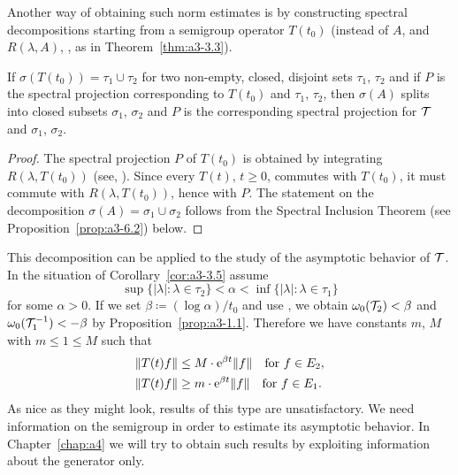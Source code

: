 Another way of obtaining such norm estimates is by constructing spectral decompositions starting from a semigroup operator $T(t_{0})$ (instead of\/ $A$, and $R(\lambda,A)$, \resp, as in Theorem~\ref{thm:a3-3.3}).
\begin{corollary}\label{cor:a3-3.5}
If\/ $\sigma(T(t_{0})) = \tau_{1} \cup \tau_{2}$ for two non-empty, closed, disjoint sets $\tau_{1}$, $\tau_{2}$ and if\/ $P$ is the spectral projection corresponding to $T(t_{0})$ and $\tau_{1}$, $\tau_{2}$, then $\sigma(A)$ splits into closed subsets $\sigma_{1}$, $\sigma_{2}$ and $P$ is the corresponding spectral projection for $\mathcal{T}$ and $\sigma_{1}$, $\sigma_{2}$.
\end{corollary}
\begin{proof}
The spectral projection $P$ of\/ $T(t_{0})$ is obtained by integrating $R(\lambda,T(t_{0}))$ (see, \eg \textcite[Section VII.3]{dunfordschwartz:1958}).
Since every $T(t)$, $t \geq 0$, commutes with $T(t_{0})$, it must commute with $R(\lambda,T(t_{0}))$, hence with $P$.
The statement on the decomposition $\sigma(A) = \sigma_{1} \cup \sigma_{2}$ follows from the Spectral Inclusion Theorem (see Proposition~\ref{prop:a3-6.2}) below.
\end{proof}
This decomposition can be applied to the study of the asymptotic behavior of\/ $\mathcal{T}$. In the situation of Corollary~\ref{cor:a3-3.5} assume
\[
\sup \{|\lambda| \colon \lambda \in \tau_{2}\} < \alpha < \inf \{|\lambda| \colon \lambda \in \tau_{1}\} 
\]
for some $\alpha > 0$. 
If we set $\beta \coloneq (\log\alpha)/t_{0}$ and use 
\textcite[Chap.~I, Theorem~6.5]{pazy:1983}, 
we obtain $\omega_{0}(\mathcal{T}_{2}) < \beta$ and $\omega_{0}(\mathcal{T}_{1}^{-1}) < -\beta$ by Proposition~\ref{prop:a3-1.1}.
Therefore we have constants $m$, $M$ with $m  \leq 1  \leq M $ such that
\begin{align*}
	\|T(t)f\| &\leq M \cdot \eu^{\beta t}\|f\| \quad \text{for } f \in E_{2} , \\
	\|T(t)f\| &\geq m \cdot \eu^{\beta t}\|f\| \quad \text{for } f \in E_{1} .
\end{align*}
As nice as they might look, results of this type are unsatisfactory. We need information on the semigroup in order to estimate its asymptotic behavior.
In Chapter~\ref{chap:a4} we will try to obtain such results by exploiting information about the generator only.
